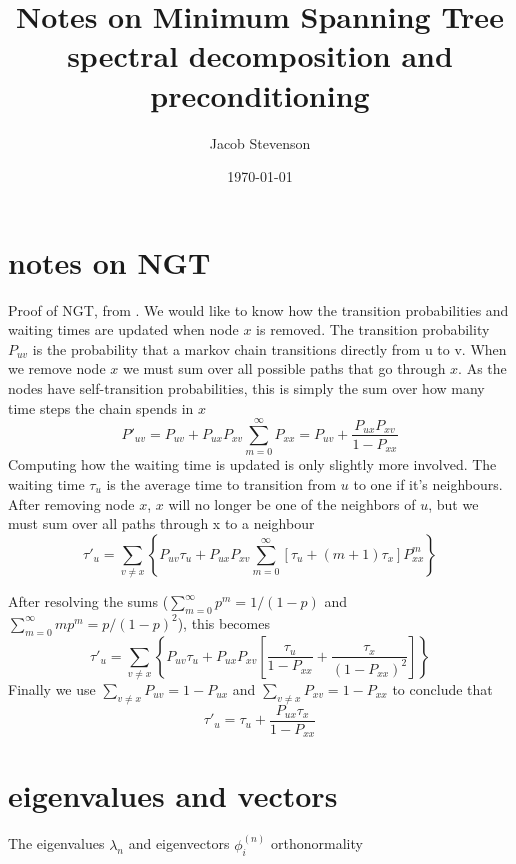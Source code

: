 \documentclass[a4paper]{article}
\title{Notes on Minimum Spanning Tree spectral decomposition and preconditioning}
\author{Jacob Stevenson}
\date{\today}
\begin{document}
\maketitle

\section{notes on NGT}
Proof of NGT, from \cite{wales.2009}.  We would like to know how the transition probabilities and waiting times
are updated when node $x$ is removed.  The transition probability $P_{uv}$ is the probability that a markov chain 
transitions directly from u to v.  When we remove node $x$ we must sum over all possible paths that go through $x$.
As the nodes have self-transition probabilities, this is simply the sum over how many time steps the chain spends in $x$
\begin{equation}
P'_{uv} = P_{uv} + P_{ux} P_{xv} \sum_{m=0}^{\infty} P_{xx} = P_{uv} + \frac{ P_{ux} P_{xv} }{ 1 - P_{xx} }
\end{equation}
Computing how the waiting time is updated is only slightly more involved.  The waiting time $\tau_u$ is the average time to transition
from $u$ to one if it's neighbours.  After removing node $x$, $x$ will no longer be one of the neighbors of $u$, but we must sum
over all paths through x to a neighbour
\begin{equation}
\tau'_u = \sum_{v \ne x} \left\{ 
P_{uv} \tau_u + P_{ux} P_{xv}
\sum_{m=0}^{\infty} \left[ \tau_u + (m+1) \tau_x \right] P_{xx}^{m}
\right\}
\end{equation}

After resolving the sums ($\sum_{m=0}^{\infty} p^m = 1/(1-p)$ and $\sum_{m=0}^{\infty} m p^m = p/(1-p)^2$), this becomes
\begin{equation}
\tau'_u = \sum_{v \ne x} \left\{ 
P_{uv} \tau_u + P_{ux} P_{xv} \left[ 
\frac{\tau_u}{1-P_{xx}} + \frac{\tau_x}{(1-P_{xx})^2}
\right]
\right\}
\end{equation}
Finally we use $\sum_{v\ne x} P_{uv} = 1-P_{ux}$ and $\sum_{v\ne x} P_{xv} = 1-P_{xx}$ to conclude that
\begin{equation}
\tau'_u = \tau_u + \frac{ P_{ux} \tau_x}{1-P_{xx}}
\end{equation}


\section{eigenvalues and vectors}

The eigenvalues $\lambda_n$ and eigenvectors $\phi^{(n)}_i$ orthonormality
\end{document}
